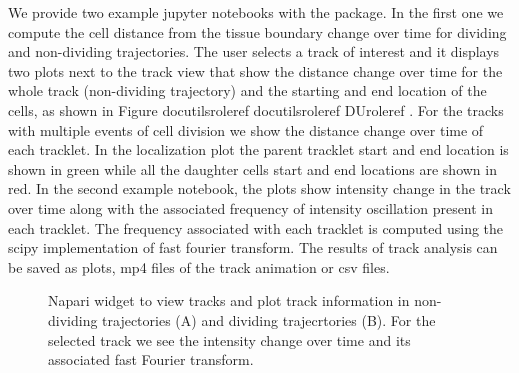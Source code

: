 \documentclass[letterpaper,compsoc,twoside,onecolumn]{IEEEtran}
\providecommand*{\DUrole}[2]{%
  \ifcsname docutilsrole#1\endcsname%
    \csname docutilsrole#1\endcsname{#2}%
  \else
    \csname DUrole#1\endcsname{#2}%
  \fi%
}
\newenvironment{DUlegend}{\small}{}
\begin{document}
We provide two example jupyter notebooks with the package. In the first one we compute the cell distance from the tissue boundary change over time for dividing and non-dividing trajectories. The user selects a track of interest and it displays two plots next to the track view that show the distance change over time for the whole track (non-dividing trajectory) and the starting and end location of the cells, as shown in Figure \DUrole{ref}{division-napari-start}. For the tracks with multiple events of cell division we show the distance change over time of each tracklet. In the localization plot the parent tracklet start and end location is shown in green while all the daughter cells start and end locations are shown in red. In the second example notebook, the plots show intensity change in the track over time along with the associated frequency of intensity oscillation present in each tracklet. The frequency associated with each tracklet is computed using the scipy implementation of fast fourier transform. The results of track analysis can be saved as plots, mp4 files of the track animation or csv files.\begin{figure}[]\noindent{}
\caption{Napari widget to view tracks and plot track information in non-dividing trajectories (A) and dividing trajecrtories (B). For the selected track we see the intensity change over time and its associated fast Fourier transform.}
\begin{DUlegend}


\end{DUlegend}
\end{figure}
\end{document}
